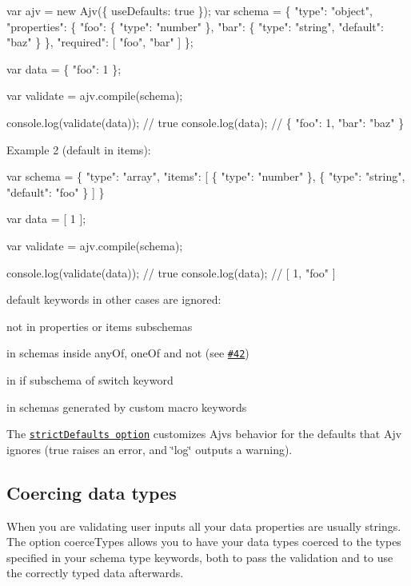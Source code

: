 \begin{DoxyCode}
var ajv = new Ajv(\{ useDefaults: true \});
var schema = \{
  "type": "object",
  "properties": \{
    "foo": \{ "type": "number" \},
    "bar": \{ "type": "string", "default": "baz" \}
  \},
  "required": [ "foo", "bar" ]
\};

var data = \{ "foo": 1 \};

var validate = ajv.compile(schema);

console.log(validate(data)); // true
console.log(data); // \{ "foo": 1, "bar": "baz" \}
\end{DoxyCode}


Example 2 ({\ttfamily default} in {\ttfamily items})\+:


\begin{DoxyCode}
var schema = \{
  "type": "array",
  "items": [
    \{ "type": "number" \},
    \{ "type": "string", "default": "foo" \}
  ]
\}

var data = [ 1 ];

var validate = ajv.compile(schema);

console.log(validate(data)); // true
console.log(data); // [ 1, "foo" ]
\end{DoxyCode}


{\ttfamily default} keywords in other cases are ignored\+:


\begin{DoxyItemize}
\item not in {\ttfamily properties} or {\ttfamily items} subschemas
\item in schemas inside {\ttfamily any\+Of}, {\ttfamily one\+Of} and {\ttfamily not} (see \href{https://github.com/epoberezkin/ajv/issues/42}{\tt \#42})
\item in {\ttfamily if} subschema of {\ttfamily switch} keyword
\item in schemas generated by custom macro keywords
\end{DoxyItemize}

The \href{#options}{\tt {\ttfamily strict\+Defaults} option} customizes Ajv\textquotesingle{}s behavior for the defaults that Ajv ignores ({\ttfamily true} raises an error, and {\ttfamily \char`\"{}log\char`\"{}} outputs a warning).

\subsection*{Coercing data types}

When you are validating user inputs all your data properties are usually strings. The option {\ttfamily coerce\+Types} allows you to have your data types coerced to the types specified in your schema {\ttfamily type} keywords, both to pass the validation and to use the correctly typed data afterwards.

